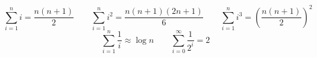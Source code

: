$$ \sum_{i=1}^{n} i = \dfrac{n(n+1)}{2} \qquad \sum_{i=1}^{n} i^{2} = \frac{n(n+1)(2n+1)}{6} \qquad \sum_{i=1}^{n} i^{3} = \left( \dfrac{n(n + 1)}{2} \right)^2 $$
$$ \sum_{i=1}^{n} \dfrac{1}{i} \approx \log{n} \qquad \sum_{i=0}^{\infty} \dfrac{1}{2^i} = 2 $$
